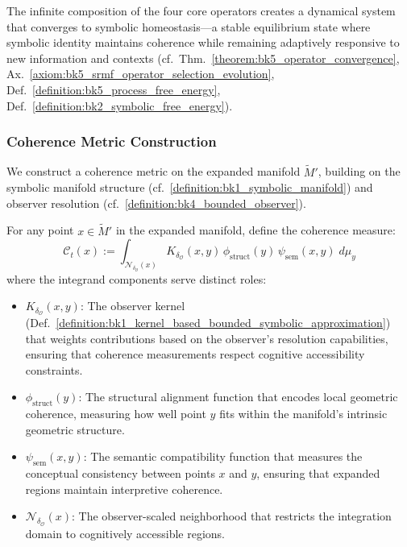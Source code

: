The infinite composition of the four core operators creates a dynamical system that converges to symbolic homeostasis---a stable equilibrium state where symbolic identity maintains coherence while remaining adaptively responsive to new information and contexts (cf.~Thm.~\ref{theorem:bk5_operator_convergence}, Ax.~\ref{axiom:bk5_srmf_operator_selection_evolution}, Def.~\ref{definition:bk5_process_free_energy}, Def.~\ref{definition:bk2_symbolic_free_energy}).

\subsubsection{Coherence Metric Construction}
\label{subsec:bk4_coherence_metric_construction}
We construct a coherence metric on the expanded manifold $\widetilde{M}'$, building on the symbolic manifold structure (cf.~\ref{definition:bk1_symbolic_manifold}) and observer resolution (cf.~\ref{definition:bk4_bounded_observer}).
\begin{definition}
\label{definition:bk4_coherence_metric}
For any point $x\in\widetilde{M}'$ in the expanded manifold, define the coherence measure:
\[
\mathcal{C}_t(x):=
\int_{\mathcal{N}_{\delta_{\mathcal{O}}}(x)}\!
  K_{\delta_{\mathcal{O}}}(x,y)\,
  \phi_{\text{struct}}(y)\,
  \psi_{\text{sem}}(x,y)\;d\mu_y
\]
where the integrand components serve distinct roles:
\begin{itemize}
\item $K_{\delta_{\mathcal{O}}}(x,y)$: The observer kernel (Def.~\ref{definition:bk1_kernel_based_bounded_symbolic_approximation}) that weights contributions based on the observer's resolution capabilities, ensuring that coherence measurements respect cognitive accessibility constraints.
\item $\phi_{\text{struct}}(y)$: The structural alignment function that encodes local geometric coherence, measuring how well point $y$ fits within the manifold's intrinsic geometric structure.
\item $\psi_{\text{sem}}(x,y)$: The semantic compatibility function that measures the conceptual consistency between points $x$ and $y$, ensuring that expanded regions maintain interpretive coherence.
\item $\mathcal{N}_{\delta_{\mathcal{O}}}(x)$: The observer-scaled neighborhood that restricts the integration domain to cognitively accessible regions.
\end{itemize}
\end{definition}

